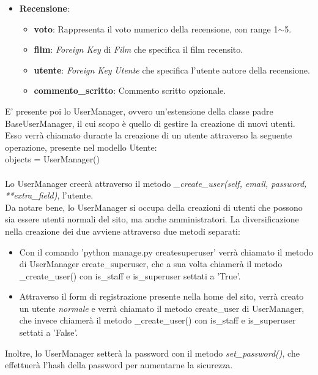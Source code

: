 \documentclass[12pt]{article}
\begin{document}
\begin{itemize}
		
		
		\item \textbf{Recensione}:
		\begin{itemize}
			\item \textbf{voto}: Rappresenta il voto numerico della recensione, con range 1$\sim$5.
			\item \textbf{film}: \textit{Foreign Key} di \textit{Film} che specifica il film recensito.
			\item \textbf{utente}: \textit{Foreign Key} \textit{Utente} che specifica l'utente autore della recensione.
			\item \textbf{commento\_scritto}: Commento scritto opzionale.
		\end{itemize}
	\end{itemize}

	\noindent E' presente poi lo UserManager, ovvero un'estensione della classe padre BaseUserManager, il cui scopo è quello di gestire la creazione di nuovi utenti. Esso verrà chiamato durante la creazione di un utente attraverso la seguente operazione, presente nel modello Utente:\\ \noindent objects = UserManager() \\ \\
	Lo UserManager creerà attraverso il metodo \textit{\_create\_user(self, email, password, **extra\_field)}, l'utente. \\
	Da notare bene, lo UserManager si occupa della creazioni di utenti che possono sia essere utenti normali del sito, ma anche amministratori. La diversificazione nella creazione dei due avviene attraverso due metodi separati:
		\begin{itemize}
			\item Con il comando 'python manage.py createsuperuser' verrà chiamato il metodo di UserManager create\_superuser, che a sua volta chiamerà il metodo \_create\_user() con is\_staff e is\_superuser settati a 'True'.
			\item Attraverso il form di registrazione presente nella home del sito, verrà creato un utente \textit{normale} e verrà chiamato il metodo create\_user di UserManager, che invece  chiamerà il metodo \_create\_user() con is\_staff e is\_superuser settati a 'False'.
		\end{itemize}
	
	\noindent Inoltre, lo UserManager setterà la password con il metodo \textit{set\_password()}, che effettuerà l'hash della password per aumentarne la sicurezza.
\end{document}
